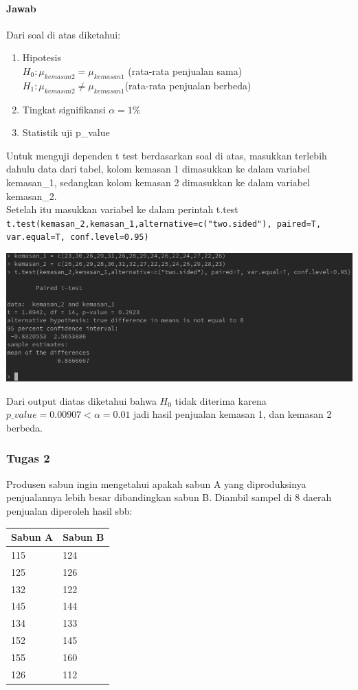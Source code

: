 \documentclass[a4paper,12pt]{article}
\begin{document}
\paragraph{Jawab\\}
Dari soal di atas diketahui:
\begin{enumerate}[label = \alph*.]
    \item Hipotesis \\
        $H_{0} : \mu_{kemasan 2} = \mu_{kemasan 1}$ (rata-rata penjualan sama)\\
        $H_{1} : \mu_{kemasan 2} \neq \mu_{kemasan 1}$(rata-rata penjualan berbeda)
    \item Tingkat signifikansi $\alpha = 1\%$
    \item Statistik uji p\_value
\end{enumerate}
Untuk menguji dependen t test berdasarkan soal di atas, masukkan terlebih dahulu data dari tabel, kolom kemasan 1 dimasukkan ke dalam variabel kemasan\_1, sedangkan kolom kemasan 2 dimasukkan
ke dalam variabel kemasan\_2.\\
Setelah itu masukkan variabel ke dalam perintah t.test\\
\texttt{t.test(kemasan\_2,kemasan\_1,alternative=c("two.sided"), paired=T, var.equal=T, conf.level=0.95)}
\begin{center}
    \includegraphics[width = \linewidth]{tugas1.png}
\end{center}
Dari output diatas diketahui bahwa $H_{0}$ tidak diterima karena $p\_value = 0.00907 < \alpha = 0.01$ jadi hasil penjualan kemasan 1, dan kemasan 2 berbeda.

\subsubsection{Tugas 2}
Produsen sabun ingin mengetahui apakah sabun A yang diproduksinya penjualannya lebih besar dibandingkan sabun B. Diambil sampel di 8 daerah penjualan diperoleh hasil sbb:
\begin{table}[!ht]
    \centering
\begin{tabular}{|l|l|}
\hline
Sabun A & Sabun B \\ \hline
115     & 124     \\ \hline
125     & 126     \\ \hline
132     & 122     \\ \hline
145     & 144     \\ \hline
134     & 133     \\ \hline
152     & 145     \\ \hline
155     & 160     \\ \hline
126     & 112     \\ \hline
\end{tabular}
\end{table}
\end{document}
